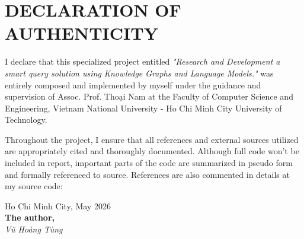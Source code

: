 \section*{DECLARATION OF AUTHENTICITY}
\thispagestyle{empty}

I declare that this specialized project entitled \textit{"Research and Development a smart query solution using Knowledge Graphs
and Language Models."} was entirely composed and implemented by myself under the guidance and supervision of Assoc. Prof. Thoại Nam at the Faculty of Computer Science and Engineering, Vietnam National University - Ho Chi Minh City University of Technology.

Throughout the project, I ensure that all references and external sources utilized are appropriately cited and thoroughly documented. Although full code won't be 
included in report, important parts of the code are summarized in pseudo form and formally referenced to source. References are also commented in details at 
my source code: 

\vspace{2cm}

\begin{flushright}
Ho Chi Minh City, May 2026 \\
\textbf{The author,} \\[0.5cm]
\textit{Vũ Hoàng Tùng}
\end{flushright}
\clearpage
{}
